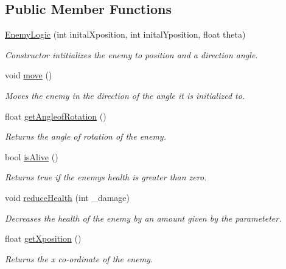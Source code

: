 \subsection*{Public Member Functions}
\begin{DoxyCompactItemize}
\item 
\hyperlink{class_enemy_logic_a6b405895fa7556810b8002b0d276d6cc}{Enemy\+Logic} (int inital\+Xposition, int inital\+Yposition, float theta)
\begin{DoxyCompactList}\small\item\em Constructor intitializes the enemy to position and a direction angle. \end{DoxyCompactList}\item 
\mbox{\label{class_enemy_logic_a2bc8ba642d677ab31f4b54ec00299e25}} 
void \hyperlink{class_enemy_logic_a2bc8ba642d677ab31f4b54ec00299e25}{move} ()
\begin{DoxyCompactList}\small\item\em Moves the enemy in the direction of the angle it is initialized to. \end{DoxyCompactList}\item 
float \hyperlink{class_enemy_logic_ade03be41505c71de49f20fc855c8fede}{get\+Angleof\+Rotation} ()
\begin{DoxyCompactList}\small\item\em Returns the angle of rotation of the enemy. \end{DoxyCompactList}\item 
bool \hyperlink{class_enemy_logic_a8dd48fa112c41249e46728d7ec8f820e}{is\+Alive} ()
\begin{DoxyCompactList}\small\item\em Returns true if the enemy\textquotesingle{}s health is greater than zero. \end{DoxyCompactList}\item 
void \hyperlink{class_enemy_logic_aaf2f8ff785c8f7410e04cfb3cb192b9b}{reduce\+Health} (int \+\_\+damage)
\begin{DoxyCompactList}\small\item\em Decreases the health of the enemy by an amount given by the parameteter. \end{DoxyCompactList}\item 
float \hyperlink{class_enemy_logic_a7eed969ab8e3d2527cdac04ef39a5aba}{get\+Xposition} ()
\begin{DoxyCompactList}\small\item\em Returns the x co-\/ordinate of the enemy. \end{DoxyCompactList}\item 

\end{DoxyCompactItemize}
